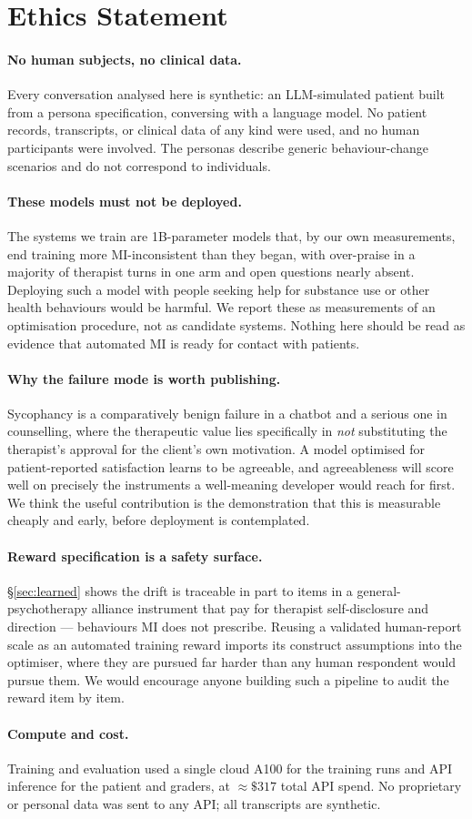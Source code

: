 \section*{Ethics Statement}

\paragraph{No human subjects, no clinical data.} Every conversation analysed here is
synthetic: an LLM-simulated patient built from a persona specification, conversing with a
language model. No patient records, transcripts, or clinical data of any kind were used, and
no human participants were involved. The personas describe generic behaviour-change scenarios
and do not correspond to individuals.

\paragraph{These models must not be deployed.} The systems we train are 1B-parameter models
that, by our own measurements, end training more MI-inconsistent than they began, with
over-praise in a majority of therapist turns in one arm and open questions nearly absent.
Deploying such a model with people seeking help for substance use or other health behaviours
would be harmful. We report these as measurements of an optimisation procedure, not as
candidate systems. Nothing here should be read as evidence that automated MI is ready for
contact with patients.

\paragraph{Why the failure mode is worth publishing.} Sycophancy is a comparatively benign
failure in a chatbot and a serious one in counselling, where the therapeutic value lies
specifically in \emph{not} substituting the therapist's approval for the client's own
motivation. A model optimised for patient-reported satisfaction learns to be agreeable, and
agreeableness will score well on precisely the instruments a well-meaning developer would
reach for first. We think the useful contribution is the demonstration that this is
measurable cheaply and early, before deployment is contemplated.

\paragraph{Reward specification is a safety surface.} \S\ref{sec:learned} shows the drift is
traceable in part to items in a general-psychotherapy alliance instrument that pay for
therapist self-disclosure and direction --- behaviours MI does not prescribe. Reusing a
validated human-report scale as an automated training reward imports its construct
assumptions into the optimiser, where they are pursued far harder than any human respondent
would pursue them. We would encourage anyone building such a pipeline to audit the reward
item by item.

\paragraph{Compute and cost.} Training and evaluation used a single cloud A100 for the
training runs and API inference for the patient and graders, at ${\approx}\$317$ total API
spend. No proprietary or personal data was sent to any API; all transcripts are synthetic.
